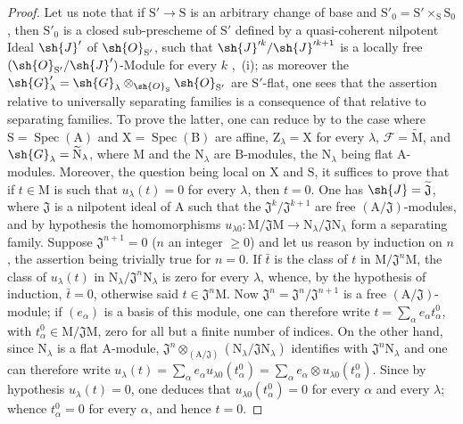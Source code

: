 \begin{proof}
Let us note that if $\mathrm{S}'\to\mathrm{S}$ is an arbitrary change of base and $\mathrm{S}'_0=\mathrm{S}'\times_\mathrm{S}\mathrm{S}_0$, then $\mathrm{S}'_0$ is a closed sub-prescheme of $\mathrm{S}'$ defined by a quasi-coherent nilpotent Ideal $\sh{J}'$ of $\sh{O}_{\mathrm{S}'}$, such that $\sh{J}'^k/\sh{J}'^{k+1}$ is a locally free $(\sh{O}_{\mathrm{S}'}/\sh{J}')$-Module for every $k$ ,~(i); as moreover the $\sh{G}'_\lambda=\sh{G}_\lambda\otimes_{\sh{O}_\mathrm{S}}\sh{O}_{\mathrm{S}'}$ are $\mathrm{S}'$-flat, one sees that the assertion relative to universally separating families is a consequence of that relative to separating families.
To prove the latter, one can reduce by  to the case where $\mathrm{S}=\operatorname{Spec}(\mathrm{A})$ and $\mathrm{X}=\operatorname{Spec}(\mathrm{B})$ are affine, $\mathrm{Z}_\lambda=\mathrm{X}$ for every $\lambda$, $\mathscr{F}=\widetilde{\mathrm{M}}$, and $\sh{G}_\lambda=\widetilde{\mathrm{N}}_\lambda$, where $\mathrm{M}$ and the $\mathrm{N}_\lambda$ are $\mathrm{B}$-modules, the $\mathrm{N}_\lambda$ being flat $\mathrm{A}$-modules.
Moreover, the question being local on $\mathrm{X}$ and $\mathrm{S}$, it suffices to prove that if $t\in\mathrm{M}$ is such that $u_\lambda(t)=0$ for every $\lambda$, then $t=0$.
One has $\sh{J}=\widetilde{\mathfrak{J}}$, where $\mathfrak{J}$ is a nilpotent ideal of $\mathrm{A}$ such that the $\mathfrak{J}^k/\mathfrak{J}^{k+1}$ are free $(\mathrm{A}/\mathfrak{J})$-modules, and by hypothesis the homomorphisms $u_{\lambda 0}:\mathrm{M}/\mathfrak{J}\mathrm{M}\to\mathrm{N}_\lambda/\mathfrak{J}\mathrm{N}_\lambda$ form a separating family.
Suppose $\mathfrak{J}^{n+1}=0$ ($n$ an integer $\geq 0$) and let us reason by induction on $n$, the assertion being trivially true for $n=0$.
If $\bar{t}$ is the class of $t$ in $\mathrm{M}/\mathfrak{J}^n\mathrm{M}$, the class of $u_\lambda(t)$ in $\mathrm{N}_\lambda/\mathfrak{J}^n\mathrm{N}_\lambda$ is zero for every $\lambda$, whence, by the hypothesis of induction, $\bar{t}=0$, otherwise said $t\in\mathfrak{J}^n\mathrm{M}$.
Now $\mathfrak{J}^n=\mathfrak{J}^n/\mathfrak{J}^{n+1}$ is a free $(\mathrm{A}/\mathfrak{J})$-module; if $(e_\alpha)$ is a basis of this module, one can therefore write $t=\sum_\alpha e_\alpha t_\alpha^0$, with $t_\alpha^0\in\mathrm{M}/\mathfrak{J}\mathrm{M}$, zero for all but a finite number of indices.
On the other hand, since $\mathrm{N}_\lambda$ is a flat $\mathrm{A}$-module, $\mathfrak{J}^n\otimes_{(\mathrm{A}/\mathfrak{J})}(\mathrm{N}_\lambda/\mathfrak{J}\mathrm{N}_\lambda)$ identifies with $\mathfrak{J}^n\mathrm{N}_\lambda$ and one can therefore write $u_\lambda(t)=\sum_\alpha e_\alpha u_{\lambda 0}(t_\alpha^0)=\sum_\alpha e_\alpha\otimes u_{\lambda 0}(t_\alpha^0)$.
Since by hypothesis $u_\lambda(t)=0$, one deduces that $u_{\lambda 0}(t_\alpha^0)=0$ for every $\alpha$ and every $\lambda$; whence $t_\alpha^0=0$ for every $\alpha$, and hence $t=0$.
\end{proof}

